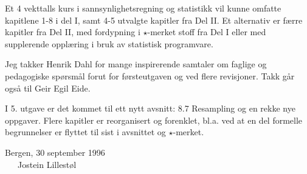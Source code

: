 Et 4 vekttalls kurs i sannsynlighetsregning og statistikk vil kunne
 omfatte kapitlene 1-8 i del I, samt 4-5 utvalgte
kapitler fra Del II. Et alternativ er færre kapitler fra Del II, med
fordypning i $\star$-merket stoff fra Del I eller med supplerende opplæring
i bruk av statistisk programvare.

Jeg takker Henrik Dahl for mange inspirerende samtaler om faglige og
pedagogiske spørsmål forut for førsteutgaven og ved flere revisjoner.
Takk går også til Geir Egil Eide.

I 5. utgave er det kommet til ett nytt avsnitt: 8.7 Resampling og en rekke nye
oppgaver. Flere kapitler er reorganisert og forenklet, bl.a. ved at en del
formelle begrunnelser er flyttet til sist i avsnittet og $\star$-merket.
\begin{flushright}
  Bergen, 30 september 1996\\ 
 \ \ \ Jostein Lillestøl \ \ \ \ \ \ 
\end{flushright}

